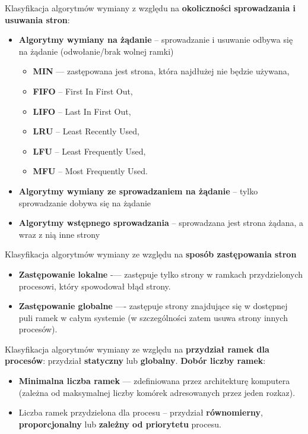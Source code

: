 \documentclass[main.tex]{subfiles}
\begin{document}
    \noindent Klasyfikacja algorytmów wymiany z względu na \textbf{okoliczności sprowadzania i usuwania stron}:
    \begin{itemize}
        \item \textbf{Algorytmy wymiany na żądanie} -- sprowadzanie i usuwanie odbywa się na żądanie (odwołanie/brak
        wolnej ramki)
        \begin{itemize}[noitemsep]
            \item \textbf{MIN} — zastępowana jest strona, która najdłużej nie będzie używana,
            \item \textbf{FIFO} -- First In First Out,
            \item \textbf{LIFO} -- Last In First Out,
            \item \textbf{LRU} -- Least Recently Used,
            \item \textbf{LFU} -- Least Frequently Used,
            \item \textbf{MFU} -- Most Frequently Used.
        \end{itemize}
        \item \textbf{Algorytmy wymiany ze sprowadzaniem na żądanie} -- tylko sprowadzanie dobywa się na żądanie
        \item \textbf{Algorytmy wstępnego sprowadzania} -- sprowadzana jest strona żądana, a wraz z nią inne strony
    \end{itemize}

    \noindent Klasyfikacja algorytmów wymiany ze względu na \textbf{sposób zastępowania stron}
    \begin{itemize}[noitemsep]
        \item \textbf{Zastępowanie lokalne} -— zastępuje tylko strony w ramkach przydzielonych procesowi,
        który spowodował błąd strony.
        \item \textbf{Zastępowanie globalne} —- zastępuje strony znajdujące się w dostępnej puli ramek w
        całym systemie (w szczególności zatem usuwa strony innych procesów).
    \end{itemize}

    \noindent Klasyfikacja algorytmów wymiany ze względu na \textbf{przydział ramek dla procesów}: przydział
    \textbf{statyczny} lub \textbf{globalny}. \textbf{Dobór liczby ramek}:
    \begin{itemize}[noitemsep]
        \item \textbf{Minimalna liczba ramek} — zdefiniowana przez architekturę komputera (zależna od maksymalnej liczby komórek adresowanych
        przez jeden rozkaz).
        \item Liczba ramek przydzielona dla procesu -- przydział \textbf{równomierny}, \textbf{proporcjonalny} lub
        \textbf{zależny od priorytetu} procesu.
    \end{itemize}
\end{document}
